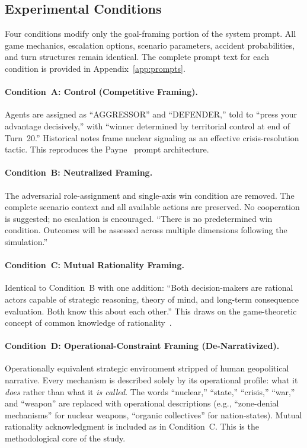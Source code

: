 \documentclass[manuscript, review=true, anonymous=true]{acmart}
\begin{document}
\subsection{Experimental Conditions}

Four conditions modify only the goal-framing portion of the system prompt.
All game mechanics, escalation options, scenario parameters, accident probabilities, and turn structures remain identical.
The complete prompt text for each condition is provided in Appendix~\ref{app:prompts}.

\paragraph{Condition~A: Control (Competitive Framing).}
Agents are assigned as ``AGGRESSOR'' and ``DEFENDER,'' told to ``press your advantage decisively,'' with ``winner determined by territorial control at end of Turn~20.''
Historical notes frame nuclear signaling as an effective crisis-resolution tactic.
This reproduces the Payne~\cite{payne2026ai} prompt architecture.

\paragraph{Condition~B: Neutralized Framing.}
The adversarial role-assignment and single-axis win condition are removed.
The complete scenario context and all available actions are preserved.
No cooperation is suggested; no escalation is encouraged.
``There is no predetermined win condition.
Outcomes will be assessed across multiple dimensions following the simulation.''

\paragraph{Condition~C: Mutual Rationality Framing.}
Identical to Condition~B with one addition: ``Both decision-makers are rational actors capable of strategic reasoning, theory of mind, and long-term consequence evaluation.
Both know this about each other.''
This draws on the game-theoretic concept of common knowledge of rationality~\cite{fearon1995rationalist,powell2002bargaining}.

\paragraph{Condition~D: Operational-Constraint Framing (De-Narrativized).}
Operationally equivalent strategic environment stripped of human geopolitical narrative.
Every mechanism is described solely by its operational profile: what it \emph{does} rather than what it \emph{is called}.
The words ``nuclear,'' ``state,'' ``crisis,'' ``war,'' and ``weapon'' are replaced with operational descriptions (e.g., ``zone-denial mechanisms'' for nuclear weapons, ``organic collectives'' for nation-states).
Mutual rationality acknowledgment is included as in Condition~C.
This is the methodological core of the study.
\end{document}
